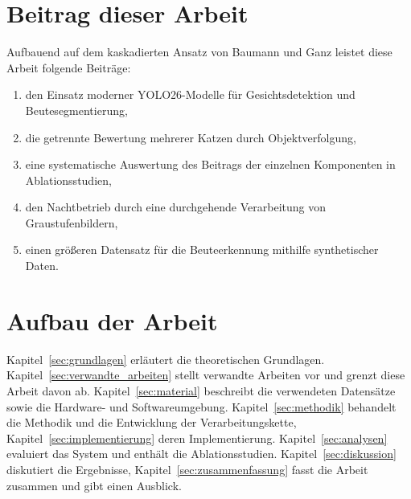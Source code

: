 \section{Beitrag dieser Arbeit}
\label{sec:beitrag}
Aufbauend auf dem kaskadierten Ansatz von Baumann und Ganz \cite{baumann2020smartcatflap} leistet diese Arbeit folgende Beiträge:

\begin{enumerate}
	\item den Einsatz moderner YOLO26-Modelle für Gesichtsdetektion und Beutesegmentierung,
	\item die getrennte Bewertung mehrerer Katzen durch Objektverfolgung,
	\item eine systematische Auswertung des Beitrags der einzelnen Komponenten in Ablationsstudien,
	\item den Nachtbetrieb durch eine durchgehende Verarbeitung von Graustufenbildern,
	\item einen größeren Datensatz für die Beuteerkennung mithilfe synthetischer Daten.
\end{enumerate}

\section{Aufbau der Arbeit}
\label{sec:aufbau}
Kapitel~\ref{sec:grundlagen} erläutert die theoretischen Grundlagen. Kapitel~\ref{sec:verwandte_arbeiten} stellt verwandte Arbeiten vor und grenzt diese Arbeit davon ab. Kapitel~\ref{sec:material} beschreibt die verwendeten Datensätze sowie die Hardware- und Softwareumgebung. Kapitel~\ref{sec:methodik} behandelt die Methodik und die Entwicklung der Verarbeitungskette, Kapitel~\ref{sec:implementierung} deren Implementierung. Kapitel~\ref{sec:analysen} evaluiert das System und enthält die Ablationsstudien. Kapitel~\ref{sec:diskussion} diskutiert die Ergebnisse, Kapitel~\ref{sec:zusammenfassung} fasst die Arbeit zusammen und gibt einen Ausblick.
